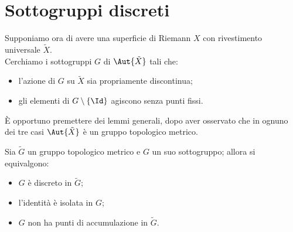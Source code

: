 \section{Sottogruppi discreti}
Supponiamo ora di avere una superficie di Riemann $X$ con rivestimento universale $\tilde X$.\\
Cerchiamo i sottogruppi $G$ di $\Aut{\tilde{X}}$ tali che:
\begin{itemize}
\item[(i)] l'azione di $G$ su $\tilde{X}$ sia propriamente discontinua;
\item[(ii)] gli elementi di $G\setminus\{\Id\}$ agiscono senza punti fissi.
\end{itemize}
È opportuno premettere dei lemmi generali, dopo aver osservato che in ognuno dei tre casi $\Aut{\tilde{X}}$ è un gruppo topologico metrico.
\begin{lemma}Sia $\tilde G$ un gruppo topologico metrico e $G$ un suo sottogruppo; allora si equivalgono:
\begin{itemize}
\item[(a)] $G$ è discreto in $\tilde G$;
\item[(b)] l'identità è isolata in $G$;
\item[(c)] $G$ non ha punti di accumulazione in $\tilde G$.
\end{itemize}
\end{lemma}

